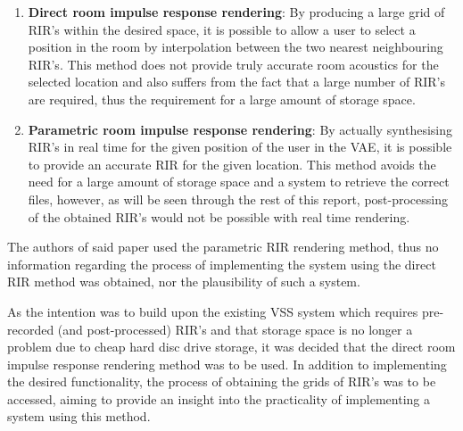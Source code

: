 \documentclass[../../main.tex]{subfiles}
\begin{document}
		\begin{enumerate}

		 \item \textbf{Direct room impulse response rendering}: By producing a large grid of \ac{RIR}'s within the desired space, it is possible to allow a user to select a position in the room by interpolation between the two nearest neighbouring \ac{RIR}'s. This method does not provide truly accurate room acoustics for the selected location and also suffers from the fact that a large number of \ac{RIR}'s are required, thus the requirement for a large amount of storage space.

		\item \textbf{Parametric room impulse response rendering}: By actually synthesising \ac{RIR}'s in real time for the given position of the user in the \ac{VAE}, it is possible to provide an accurate \ac{RIR} for the given location. This method avoids the need for a large amount of storage space and a system to retrieve the correct files, however, as will be seen through the rest of this report, post-processing of the obtained {RIR}'s would not be possible with real time rendering.
		\end{enumerate}

		The authors of said paper used the parametric \ac{RIR} rendering method, thus no information regarding the process of implementing the system using the direct \ac{RIR} method was obtained, nor the plausibility of such a system.

		As the intention was to build upon the existing \ac{VSS} system which requires pre-recorded (and post-processed) \ac{RIR}'s and that storage space is no longer a problem due to cheap hard disc drive storage, it was decided that the direct room impulse response rendering method was to be used. In addition to implementing the desired functionality, the process of obtaining the grids of \ac{RIR}'s was to be accessed, aiming to provide an insight into the practicality of implementing a system using this method.

\end{document}
